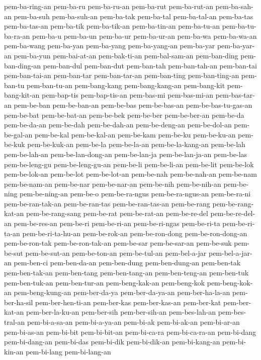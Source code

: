 {pem-ba-ring-an pem-ba-ru pem-ba-ru-an pem-ba-rut pem-ba-rut-an
pem-ba-sah-an pem-ba-suh pem-ba-suh-an pem-ba-tak pem-ba-tal pem-ba-tal-an
pem-ba-tas pem-ba-tas-an pem-ba-tik pem-ba-tik-an pem-ba-tin-an
pem-ba-tu-an pem-ba-tu-ba-ra-an pem-ba-u pem-ba-un pem-ba-ur pem-ba-ur-an
pem-ba-wa pem-ba-wa-an pem-ba-wang pem-ba-yan pem-ba-yang pem-ba-yang-an
pem-ba-yar pem-ba-yar-an pem-ba-yun pem-bai-at-an pem-bak-ti-an
pem-bal-sam-an pem-ban-ding pem-ban-ding-an pem-ban-dul pem-ban-dut
pem-ban-tah pem-ban-tah-an pem-ban-tai pem-ban-tai-an pem-ban-tar
pem-ban-tar-an pem-ban-ting pem-ban-ting-an pem-ban-tu pem-ban-tu-an
pem-bang-kang pem-bang-kang-an pem-bang-kit pem-bang-kit-an pem-bap-tis
pem-bap-tis-an pem-bas-mi pem-bas-mi-an pem-bas-tar-an pem-be-ban
pem-be-ban-an pem-be-bas pem-be-bas-an pem-be-bas-tu-gas-an pem-be-bat
pem-be-bat-an pem-be-bek pem-be-ber pem-be-ber-an pem-be-da pem-be-da-an
pem-be-dah pem-be-dah-an pem-be-deng-an pem-be-dol-an pem-be-gal-an
pem-be-kal pem-be-kal-an pem-be-kam pem-be-ku pem-be-ku-an pem-be-kuk
pem-be-kuk-an pem-be-la pem-be-la-an pem-be-la-kang-an pem-be-lah
pem-be-lah-an pem-be-lan-dong-an pem-be-lan-ja pem-be-lan-ja-an pem-be-las
pem-be-leng-gu pem-be-leng-gu-an pem-be-li pem-be-li-an pem-be-lit
pem-be-lok pem-be-lok-an pem-be-lot pem-be-lot-an pem-be-nah pem-be-nah-an
pem-be-nam pem-be-nam-an pem-be-nar pem-be-nar-an pem-be-nih pem-be-nih-an
pem-be-ning pem-be-ning-an pem-be-o pem-be-ra-ngus pem-be-ra-ngus-an
pem-be-ra-ni pem-be-ran-tak-an pem-be-ran-tas pem-be-ran-tas-an
pem-be-rang pem-be-rang-kat-an pem-be-rang-sang pem-be-rat pem-be-rat-an
pem-be-re-del pem-be-re-del-an pem-be-res-an pem-be-ri pem-be-ri-an
pem-be-ri-ngas pem-be-ri-ta pem-be-ri-ta-an pem-be-ri-ta-hu-an
pem-be-rok-an pem-be-ron-dong pem-be-ron-dong-an pem-be-ron-tak
pem-be-ron-tak-an pem-be-sar pem-be-sar-an pem-be-suk pem-be-sut
pem-be-sut-an pem-be-ton-an pem-be-tul-an pem-bel-a-jar pem-bel-a-jar-an
pem-ben-ci pem-ben-da-an pem-ben-dung pem-ben-dung-an pem-ben-tak
pem-ben-tak-an pem-ben-tang pem-ben-tang-an pem-ben-teng-an pem-ben-tuk
pem-ben-tuk-an pem-ben-tur-an pem-beng-kak-an pem-beng-kok pem-beng-kok-an
pem-beng-kung-an pem-ber-da-ya pem-ber-da-ya-an pem-ber-ha-la-an
pem-ber-ha-sil pem-ber-hen-ti-an pem-ber-kas pem-ber-kas-an pem-ber-kat
pem-ber-kat-an pem-ber-la-ku-an pem-ber-sih pem-ber-sih-an pem-bes-lah-an
pem-bes-tral-an pem-bi-a-sa-an pem-bi-a-ya-an pem-bi-ak pem-bi-ak-an
pem-bi-ar-an pem-bi-as-an pem-bi-bit pem-bi-bit-an pem-bi-ca-ra
pem-bi-ca-ra-an pem-bi-dang pem-bi-dang-an pem-bi-das pem-bi-dik
pem-bi-dik-an pem-bi-kang-an pem-bi-kin-an pem-bi-lang pem-bi-lang-an
}
